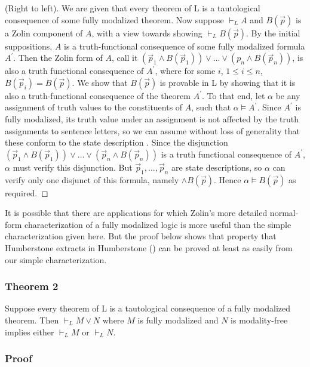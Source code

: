 \documentclass[
  11pt,
  letterpaper,
  DIV=11,
  numbers=noendperiod,
  twoside]{scrartcl}
\begin{document}
(Right to left). We are given that every theorem of L is a tautological
consequence of some fully modalized theorem. Now suppose \(\vdash_L A\)
and \(B(\vec{p})\) is a Zolin component of \(A\), with a view towards
showing \(\vdash_L B(\vec{p})\). By the initial suppositions, \(A\) is a
truth-functional consequence of some fully modalized formula
\(A^\prime\). Then the Zolin form of \(A\), call it
\((\vec{p}_1\wedge B(\vec{p}_1))\vee {\ldots}\vee (p_n\wedge B(\vec{p}_n))\),
is also a truth functional consequence of \(A^\prime\), where for some
\(i\), \(1\le i\le n\), \(B(\vec{p}_i)=B(\vec{p})\). We show that
\(B(\vec{p})\) is provable in L by showing that it is also a
truth-functional consequence of the theorem \(A^\prime\). To that end,
let \(\alpha\) be any assignment of truth values to the constituents of
\(A\), such that \(\alpha\models A^\prime\). Since \(A^\prime\) is fully
modalized, its truth value under an assignment is not affected by the
truth assignments to sentence letters, so we can assume without loss of
generality that these conform to the state description . Since the
disjunction
\((\vec{p}_1\wedge B(\vec{p}_1))\vee {\ldots}\vee (\vec{p}_n\wedge B(\vec{p}_n))\)
is a truth functional consequence of \(A^\prime\), \(\alpha\) must
verify this disjunction. But \(\vec{p}_1,{\ldots},\vec{p}_n\) are state
descriptions, so \(\alpha\) can verify only one disjunct of this
formula, namely \(\wedge B(\vec{p})\). Hence
\(\alpha\models B(\vec{p})\) as required.~◻

It is possible that there are applications for which Zolin's more
detailed normal-form characterization of a fully modalized logic is more
useful than the simple characterization given here. But the proof below
shows that property that Humberstone extracts in Humberstone
() can be proved at least as easily
from our simple characterization.

\subsubsection*{Theorem 2}\label{theorem-2}

Suppose every theorem of L is a tautological consequence of a fully
modalized theorem. Then \(\vdash_LM\vee N\) where \(M\) is fully
modalized and \(N\) is modality-free implies either \(\vdash_LM\) or
\(\vdash_LN\).

\subsubsection*{Proof}\label{proof-1}
\end{document}
